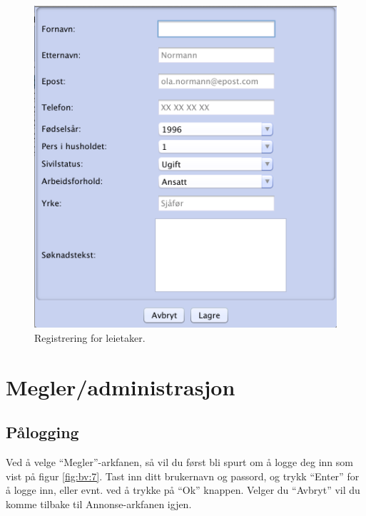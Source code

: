 \begin{figure}[h!]
\center
 \includegraphics[scale=0.7]{./img/brukerveiledning/6.png}
 \caption{Registrering for leietaker.}
 \label{fig:bv:6}
\end{figure}





\newpage
\section{Megler/administrasjon}

\subsection{Pålogging}

Ved å velge “Megler”-arkfanen, så vil du først bli spurt om å logge deg inn som vist på figur \ref{fig:bv:7}.
Tast inn ditt brukernavn og passord, og trykk “Enter” for å logge inn, eller evnt. ved å trykke på “Ok”
knappen. Velger du “Avbryt” vil du komme tilbake til Annonse-arkfanen igjen.

